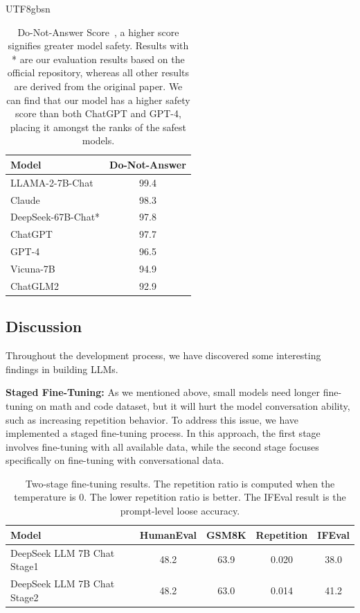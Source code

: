 \documentclass[11pt, a4paper, logo, copyright, nonumbering]{deepseek}
\begin{document}
\begin{CJK*}{UTF8}{gbsn}
\begin{table}[!ht]
\centering \small
\begin{tabular}{lc}
\toprule
Model &  Do-Not-Answer \\ \midrule
LLAMA-2-7B-Chat & 99.4\\ 
Claude & 98.3 \\ 	 
DeepSeek-67B-Chat* & 97.8\\ 
ChatGPT & 97.7\\ 	
GPT-4 & 96.5\\ 
Vicuna-7B & 94.9\\ 
ChatGLM2 & 92.9\\ 
\bottomrule
\end{tabular}
\caption{Do-Not-Answer Score~\citep{donotanswer}, a higher score signifies greater model safety. Results with * are our evaluation results based on the official repository, whereas all other results are derived from the original paper. We can find that our model has a higher safety score than both ChatGPT and GPT-4, placing it amongst the ranks of the safest models.}
\label{tab:performance_comparison}
\end{table}

\subsection{Discussion}

Throughout the development process, we have discovered some interesting findings in building LLMs. 

\textbf{Staged Fine-Tuning:} As we mentioned above, small models need longer fine-tuning on math and code dataset, but it will hurt the model conversation ability, such as increasing repetition behavior. To address this issue, we have implemented a staged fine-tuning process. In this approach, the first stage involves fine-tuning with all available data, while the second stage focuses specifically on fine-tuning with conversational data.

\begin{table}[h]
\centering  \small
\begin{tabular}{lcccc}
	\toprule
Model & HumanEval & GSM8K & Repetition & IFEval  \\ \midrule
DeepSeek LLM 7B Chat Stage1 & 48.2 & 63.9 & 0.020 & 38.0 \\ 
DeepSeek LLM 7B Chat Stage2 & 48.2 & 63.0 & 0.014 & 41.2\\ 	\bottomrule
\end{tabular}
\caption{Two-stage fine-tuning results. The repetition ratio is computed when the temperature is 0. The lower repetition ratio is better. The IFEval result is the prompt-level loose accuracy. }
\label{table:twostage}
\end{table}


\end{CJK*}
\end{document}
